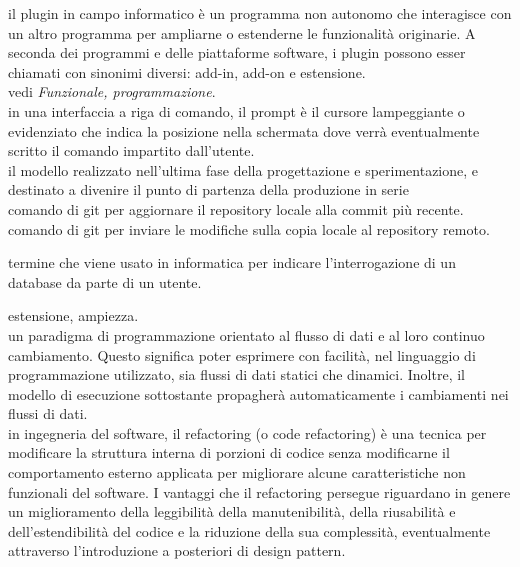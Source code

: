 \documentclass{scalatekids-article}
\begin{document}
   il plugin in campo informatico è un programma non autonomo che interagisce con un altro programma per ampliarne o estenderne le funzionalità originarie.
  A seconda dei programmi e delle piattaforme software, i plugin possono esser chiamati con sinonimi diversi: add-in, add-on e estensione.
  \\
  
   vedi \textit{Funzionale, programmazione}.
  \\
  
   in una interfaccia a riga di comando, il prompt è il cursore lampeggiante o evidenziato che indica la posizione nella schermata dove verrà eventualmente scritto il comando impartito dall'utente.
  \\

   il modello realizzato nell’ultima fase della progettazione e sperimentazione, e destinato a divenire il punto di partenza della produzione in serie
  \\

   comando di git per aggiornare il repository locale alla commit più recente.
  \\

   comando di git per inviare le modifiche sulla copia locale al repository remoto.
  \\


   termine che viene usato in informatica per indicare l'interrogazione di un database da parte di un utente.
  \\


   estensione, ampiezza.
  \\

   un paradigma di programmazione orientato al flusso di dati e al loro continuo cambiamento.
  Questo significa poter esprimere con facilità, nel linguaggio di programmazione utilizzato, sia flussi di dati statici che dinamici.
  Inoltre, il modello di esecuzione sottostante propagherà automaticamente i cambiamenti nei flussi di dati.
  \\

   in ingegneria del software, il refactoring (o code refactoring) è una tecnica per modificare la struttura interna di porzioni di codice senza modificarne il comportamento esterno applicata per migliorare alcune caratteristiche non funzionali del software.
  I vantaggi che il refactoring persegue riguardano in genere un miglioramento della leggibilità della manutenibilità, della riusabilità e dell'estendibilità del codice e la riduzione della sua complessità, eventualmente attraverso l'introduzione a posteriori di design pattern.
  \\
\end{document}
